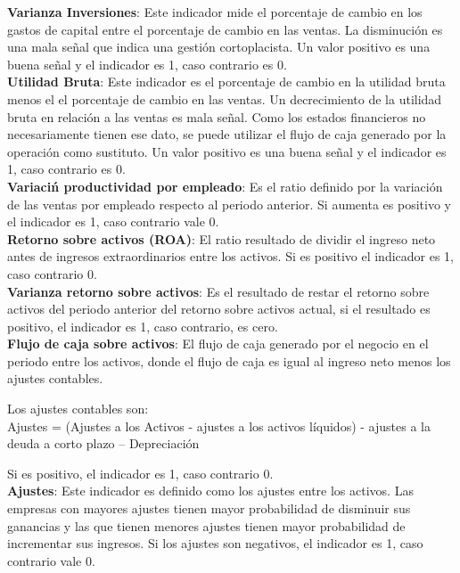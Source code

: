 \textbf{Varianza Inversiones}: Este indicador mide el porcentaje de cambio en los gastos de capital entre el porcentaje de cambio en las ventas. La disminución es una mala señal que indica una gestión cortoplacista. Un valor positivo es una buena señal y el indicador es 1, caso contrario es 0.\\

\textbf{Utilidad Bruta}: Este indicador es el porcentaje de cambio en la utilidad bruta menos el el porcentaje de cambio en las ventas. Un decrecimiento de la utilidad bruta en relación a las ventas es mala señal. Como los estados financieros no necesariamente tienen ese dato, se puede utilizar el flujo de caja generado por la operación como sustituto. Un valor positivo es una buena señal y el indicador es 1, caso contrario es 0.\\

\textbf{Variaci\'n productividad por empleado}: Es el ratio definido por la variación de las ventas por empleado respecto al periodo anterior. Si aumenta es positivo y el indicador es 1, caso contrario vale 0.\\

\textbf{Retorno sobre activos (ROA)}: El ratio resultado de dividir el ingreso neto antes de ingresos extraordinarios entre los activos. Si es positivo el indicador es 1, caso contrario 0.\\

\textbf{Varianza retorno sobre activos}: Es el resultado de restar el retorno sobre activos del periodo anterior del retorno sobre activos actual, si el resultado es positivo, el indicador es 1, caso contrario, es cero.\\

\textbf{Flujo de caja sobre activos}: El flujo de caja generado por el negocio en el periodo entre los activos, donde el flujo de caja es igual al ingreso neto menos los ajustes contables.

Los ajustes contables son:\\

Ajustes = (Ajustes a los Activos - ajustes a los activos líquidos) - ajustes a la deuda a corto plazo – Depreciaci\'on

Si es positivo, el indicador es 1, caso contrario 0.\\

\textbf{Ajustes}: Este indicador es definido como los ajustes entre los activos. Las empresas con  mayores ajustes tienen mayor probabilidad de disminuir sus ganancias y las que tienen menores ajustes tienen mayor probabilidad de incrementar sus ingresos. Si los ajustes son negativos, el indicador es 1, caso contrario vale 0.\\

